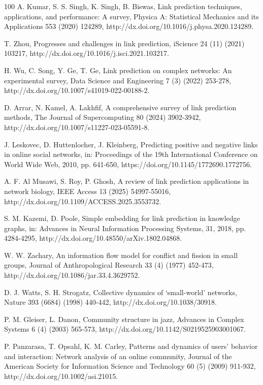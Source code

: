 \documentclass{article}
\begin{document}
\begin{thebibliography}{100}
	A. Kumar, S. S. Singh, K. Singh, B. Biswas, Link prediction techniques, applications, and performance: A survey, Physica A: Statistical Mechanics and its Applications 553 (2020) 124289, http://dx.doi.org/10.1016/j.physa.2020.124289.
	
	T. Zhou, Progresses and challenges in link prediction, iScience 24 (11) (2021) 103217, http://dx.doi.org/10.1016/j.isci.2021.103217.
	
	H. Wu, C. Song, Y. Ge, T. Ge, Link prediction on complex networks: An experimental survey, Data Science and Engineering 7 (3) (2022) 253-278, http://dx.doi.org/10.1007/s41019-022-00188-2.
	
	D. Arrar, N. Kamel, A. Lakhfif, A comprehensive survey of link prediction methods, The Journal of Supercomputing 80 (2024) 3902-3942, http://dx.doi.org/10.1007/s11227-023-05591-8.
	
	
	J. Leskovec, D. Huttenlocher, J. Kleinberg, Predicting positive and negative links in online social networks, in: Proceedings of the 19th International Conference on World Wide Web, 2010, pp. 641-650, https://doi.org/10.1145/1772690.1772756.
	
	A. F. Al Musawi, S. Roy, P. Ghosh, A review of link prediction applications in network biology, IEEE Access 13 (2025) 54997-55016, http://dx.doi.org/10.1109/ACCESS.2025.3553732.
	
	S. M. Kazemi, D. Poole, Simple embedding for link prediction in knowledge graphs, in: Advances in Neural Information Processing Systems, 31, 2018, pp. 4284-4295, http://dx.doi.org/10.48550/arXiv.1802.04868. 
	
	W. W. Zachary, An information flow model for conflict and fission in small groups, Journal of Anthropological Research 33 (4) (1977) 452-473, http://dx.doi.org/10.1086/jar.33.4.3629752.
	
	D. J. Watts, S. H. Strogatz, Collective dynamics of `small-world' networks, Nature 393 (6684) (1998) 440-442, http://dx.doi.org/10.1038/30918.
	
	P. M. Gleiser, L. Danon, Community structure in jazz, Advances in Complex Systems 6 (4) (2003) 565-573, http://dx.doi.org/10.1142/S0219525903001067.
	
	P. Panzarasa, T. Opsahl, K. M. Carley, Patterns and dynamics of users' behavior and interaction: Network analysis of an online community, Journal of the American Society for Information Science and Technology 60 (5) (2009) 911-932, http://dx.doi.org/10.1002/asi.21015.


\end{thebibliography}
\end{document}
